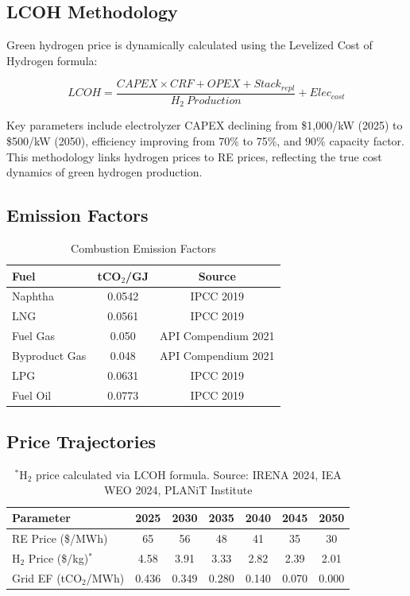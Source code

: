 \documentclass[12pt,a4paper]{article}
\begin{document}
\subsection{LCOH Methodology}

Green hydrogen price is dynamically calculated using the Levelized Cost of Hydrogen formula:

\begin{equation}
LCOH = \frac{CAPEX \times CRF + OPEX + Stack_{repl}}{H_2\ Production} + Elec_{cost}
\end{equation}

Key parameters include electrolyzer CAPEX declining from \$1,000/kW (2025) to \$500/kW (2050), efficiency improving from 70\% to 75\%, and 90\% capacity factor. This methodology links hydrogen prices to RE prices, reflecting the true cost dynamics of green hydrogen production.

\subsection{Emission Factors}

\begin{table}[H]
\centering
\caption{Combustion Emission Factors}
\begin{tabular}{lcc}
\toprule
Fuel & tCO$_2$/GJ & Source \\
\midrule
Naphtha & 0.0542 & IPCC 2019 \\
LNG & 0.0561 & IPCC 2019 \\
Fuel Gas & 0.050 & API Compendium 2021 \\
Byproduct Gas & 0.048 & API Compendium 2021 \\
LPG & 0.0631 & IPCC 2019 \\
Fuel Oil & 0.0773 & IPCC 2019 \\
\bottomrule
\end{tabular}
\end{table}

\subsection{Price Trajectories}

\begin{table}[H]
\centering
\caption{Energy Price Trajectories}
\begin{tabular}{lcccccc}
\toprule
Parameter & 2025 & 2030 & 2035 & 2040 & 2045 & 2050 \\
\midrule
RE Price (\$/MWh) & 65 & 56 & 48 & 41 & 35 & 30 \\
H$_2$ Price (\$/kg)$^*$ & 4.58 & 3.91 & 3.33 & 2.82 & 2.39 & 2.01 \\
Grid EF (tCO$_2$/MWh) & 0.436 & 0.349 & 0.280 & 0.140 & 0.070 & 0.000 \\
\bottomrule
\end{tabular}
\caption*{$^*$H$_2$ price calculated via LCOH formula. Source: IRENA 2024, IEA WEO 2024, PLANiT Institute}
\end{table}
\end{document}
